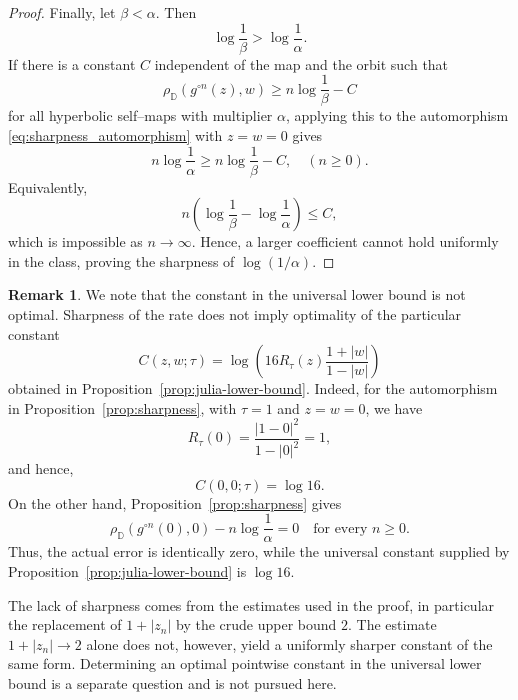 \documentclass[12pt]{amsart}
\numberwithin{equation}{section}
\theoremstyle{plain}
\theoremstyle{definition}
\newtheorem{remark}[equation]{Remark}
\begin{document}
\begin{proof}
Finally, let $\beta<\alpha$. Then
\begin{equation*}
\log\frac{1}{\beta}
>
\log\frac{1}{\alpha}.
\end{equation*}
If there is a constant $C$ independent of the map and the orbit
such that
\begin{equation*}
\rho_{\mathbb{D}}(g^{\circ n}(z),w)
\geq
n\log\frac{1}{\beta}-C
\end{equation*}
for all hyperbolic self--maps with multiplier $\alpha$, applying this
to the automorphism \eqref{eq:sharpness_automorphism} with $z=w=0$ gives
\begin{equation*}
n\log\frac{1}{\alpha}
\geq
n\log\frac{1}{\beta}-C,
\quad(n\geq0).
\end{equation*}
Equivalently,
\begin{equation*}
n\left(
\log\frac{1}{\beta}
-
\log\frac{1}{\alpha}
\right)
\leq C,
\end{equation*}
which is impossible as $n\to\infty$. Hence, a larger coefficient cannot
hold uniformly in the class, proving the sharpness of
$\log(1/\alpha)$.
\end{proof}

\begin{remark}
\label{rem:constant-not-sharp}
We note that the constant in the universal lower bound is not optimal.
Sharpness of the rate does not imply optimality of the particular
constant
\begin{equation*}
C(z,w;\tau)
=
\log\left(
16R_\tau(z)\frac{1+|w|}{1-|w|}
\right)
\end{equation*}
obtained in Proposition~\ref{prop:julia-lower-bound}. Indeed, for the
automorphism in Proposition~\ref{prop:sharpness}, with
$\tau=1$ and $z=w=0$, we have
\begin{equation*}
R_\tau(0)=\frac{|1-0|^2}{1-|0|^2}=1,
\end{equation*}
and hence,
\begin{equation*}
C(0,0;\tau)
=
\log16.
\end{equation*}
On the other hand, Proposition~\ref{prop:sharpness} gives
\begin{equation*}
\rho_{\mathbb{D}}(g^{\circ n}(0),0)
-
n\log\frac{1}{\alpha}
=
0
\quad\text{for every }n\geq0.
\end{equation*}
Thus, the actual error is identically zero, while the universal
constant supplied by Proposition~\ref{prop:julia-lower-bound} is
$\log16$.

The lack of sharpness comes from the estimates used in the proof,
in particular the replacement of $1+|z_n|$ by the crude upper bound
$2$. The estimate $1+|z_n|\to2$ alone does not, however, yield a
uniformly sharper constant of the same form. Determining an optimal
pointwise constant in the universal lower bound is a separate
question and is not pursued here.
\end{remark}
\end{document}
